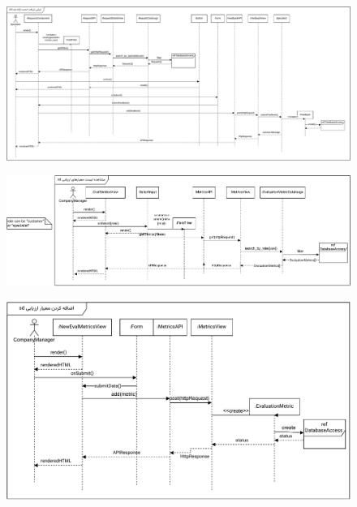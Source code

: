 \begin{figure}[ht!]
	\centering
	\includegraphics[scale=0.8]{figs/design-sequence/3-25.pdf}
\end{figure}
\FloatBarrier
\newpage

\eject \pdfpagewidth=13in \pdfpageheight=6in


\begin{figure}[ht!]
	\centering
	\includegraphics[scale=0.8]{figs/design-sequence/3-26.pdf}
\end{figure}
\FloatBarrier
\newpage

\eject \pdfpagewidth=10in \pdfpageheight=8in

\begin{figure}[ht!]
	\centering
	\includegraphics[scale=0.8]{figs/design-sequence/3-27.pdf}
\end{figure}
\FloatBarrier
\newpage

